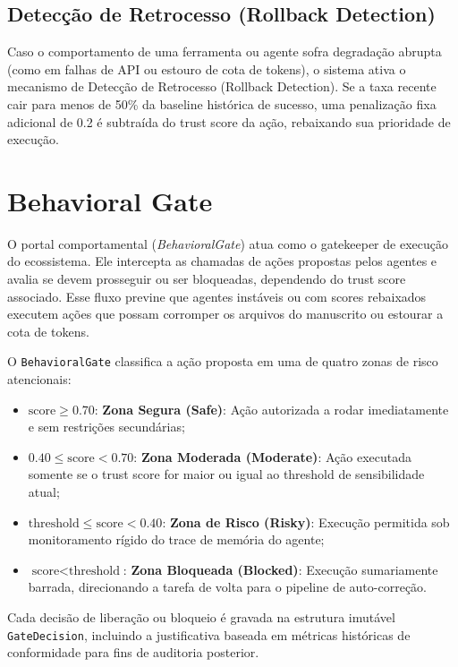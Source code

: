 \documentclass[12pt,a4paper,oneside]{abntex2}
\begin{document}
\subsection{Detecção de Retrocesso (Rollback Detection)}

Caso o comportamento de uma ferramenta ou agente sofra degradação abrupta (como em falhas de API ou estouro de cota de tokens), o sistema ativa o mecanismo de Detecção de Retrocesso (Rollback Detection). Se a taxa recente cair para menos de 50\% da baseline histórica de sucesso, uma penalização fixa adicional de 0.2 é subtraída do trust score da ação, rebaixando sua prioridade de execução.

\section{Behavioral Gate}

O portal comportamental (\textit{BehavioralGate}) atua como o gatekeeper de execução do ecossistema. Ele intercepta as chamadas de ações propostas pelos agentes e avalia se devem prosseguir ou ser bloqueadas, dependendo do trust score associado. Esse fluxo previne que agentes instáveis ou com scores rebaixados executem ações que possam corromper os arquivos do manuscrito ou estourar a cota de tokens.

O \texttt{BehavioralGate} classifica a ação proposta em uma de quatro zonas de risco atencionais:

\begin{itemize}
    \item $\text{score} \geq 0.70$: \textbf{Zona Segura (Safe)}: Ação autorizada a rodar imediatamente e sem restrições secundárias;
    \item $0.40 \leq \text{score} < 0.70$: \textbf{Zona Moderada (Moderate)}: Ação executada somente se o trust score for maior ou igual ao threshold de sensibilidade atual;
    \item $\text{threshold} \leq \text{score} < 0.40$: \textbf{Zona de Risco (Risky)}: Execução permitida sob monitoramento rígido do trace de memória do agente;
    \item $\text{score} < \text{threshold}$: \textbf{Zona Bloqueada (Blocked)}: Execução sumariamente barrada, direcionando a tarefa de volta para o pipeline de auto-correção.
\end{itemize}

Cada decisão de liberação ou bloqueio é gravada na estrutura imutável \texttt{GateDecision}, incluindo a justificativa baseada em métricas históricas de conformidade para fins de auditoria posterior.
\end{document}
